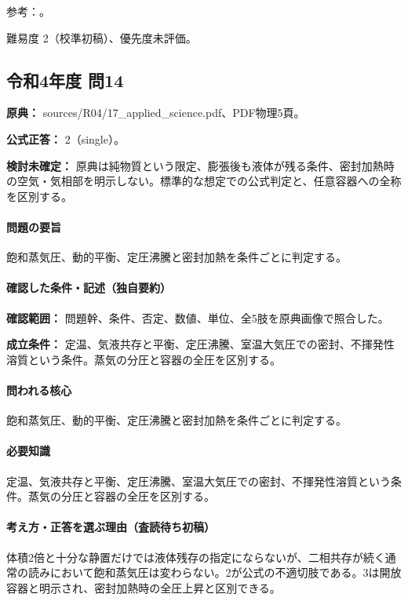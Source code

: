\par 参考：\cite{mit_clapeyron2008}。

\par 難易度 2（校準初稿）、優先度未評価。

\subsection{令和4年度 問14}
\label{q:r04-reg-applied-14}

\noindent\textbf{原典：} sources/R04/17\_applied\_science.pdf、PDF物理5頁。

\textbf{公式正答：} 2（single）。

\par\textbf{検討未確定：} 原典は純物質という限定、膨張後も液体が残る条件、密封加熱時の空気・気相部を明示しない。標準的な想定での公式判定と、任意容器への全称を区別する。

\paragraph{問題の要旨} 飽和蒸気圧、動的平衡、定圧沸騰と密封加熱を条件ごとに判定する。

\paragraph{確認した条件・記述（独自要約）}\mbox{}\par

\noindent\textbf{確認範囲：} 問題幹、条件、否定、数値、単位、全5肢を原典画像で照合した。\par

\noindent\textbf{成立条件：} 定温、気液共存と平衡、定圧沸騰、室温大気圧での密封、不揮発性溶質という条件。蒸気の分圧と容器の全圧を区別する。\par

\paragraph{問われる核心} 飽和蒸気圧、動的平衡、定圧沸騰と密封加熱を条件ごとに判定する。

\paragraph{必要知識} 定温、気液共存と平衡、定圧沸騰、室温大気圧での密封、不揮発性溶質という条件。蒸気の分圧と容器の全圧を区別する。

\paragraph{考え方・正答を選ぶ理由（査読待ち初稿）} 体積2倍と十分な静置だけでは液体残存の指定にならないが、二相共存が続く通常の読みにおいて飽和蒸気圧は変わらない。2が公式の不適切肢である。3は開放容器と明示され、密封加熱時の全圧上昇と区別できる。

